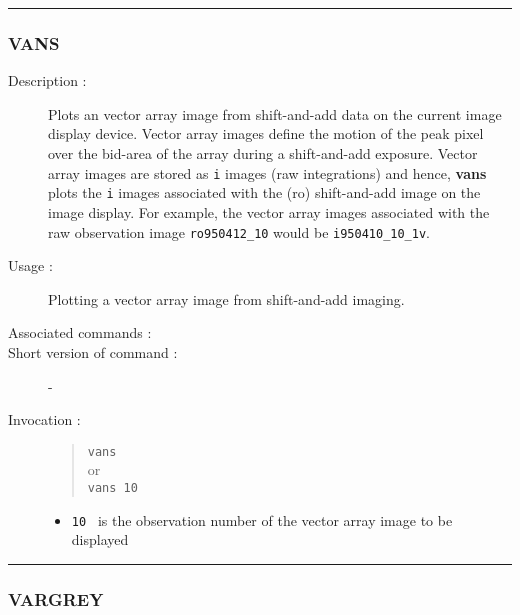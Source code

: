 \hrule
\subsubsection*{\label{VANS}VANS}

\begin{description}

\item[Description :] Plots an vector array image from shift-and-add
data on the current image display device.  Vector array images define
the motion of the peak pixel over the bid-area of the array during a
shift-and-add exposure.  Vector array images are stored as {\tt i}
images (raw integrations) and hence, {\bf vans} plots the {\tt i}
images associated with the ({\sc ro}) shift-and-add image on the image
display.  For example, the vector array images associated with the raw
observation image {\tt ro950412\_10} would be {\tt i950410\_10\_1v}.

\item[Usage :] Plotting a vector array image from shift-and-add imaging.
\item[Associated commands :] {\tt {}}
\item[Short version of command :] -
\item[Invocation :]

\begin{quote}{\tt  vans }\\
or \\
{\tt vans 10 }
\end{quote}

\begin{itemize}

\item {\tt 10 } is the observation number of the vector array image
 to be displayed
\end{itemize}

\end{description}

\hrule
\subsubsection*{\label{VARGREY}VARGREY}

